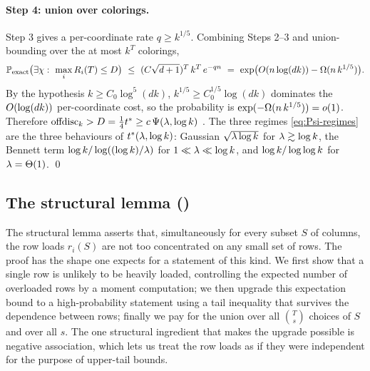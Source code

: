 \paragraph{Step 4: union over colorings.}
Step 3 gives a per-coordinate rate $q\ge k^{1/5}$. Combining Steps 2--3 and union-bounding over the at most $k^T$ colorings,
\[
  \Pr_{\mathrm{exact}}\big(\exists\chi:\ \max_i\rangeop_i(T)\le D\big)\ \le\ (C\sqrt{d+1})^T\,k^T\,e^{-q n}
  \ =\ \exp\!\big(\Oh(n\log(dk))-\Om(n\,k^{1/5})\big).
\]
By the hypothesis $k\ge C_0\log^5(dk)$, $k^{1/5}\ge C_0^{1/5}\log(dk)$ dominates the $O(\log(dk))$ per-coordinate cost, so
the probability is $\exp(-\Omega(n\,k^{1/5}))=o(1)$. Therefore $\mathrm{offdisc}_k>D=\tfrac14 t^*\ge c\,\Psi(\lambda,\log k)$ \whp. The three
regimes \eqref{eq:Psi-regimes} are the three behaviours of $t^*(\lambda,\log k)$: Gaussian $\sqrt{\lambda\log k}$ for
$\lambda\gtrsim\log k$, the Bennett term $\log k/\log((\log k)/\lambda)$ for $1\ll\lambda\ll\log k$, and $\log k/\log\log k$ for
$\lambda=\Theta(1)$. \qed

\subsection{The structural lemma ()}\label{app:structural-full}

The structural lemma asserts that, simultaneously for every subset $S$ of columns, the row loads $r_i(S)$ are not too
concentrated on any small set of rows. The proof has the shape one expects for a statement of this kind. We first show that
a single row is unlikely to be heavily loaded, controlling the expected number of overloaded rows by a moment computation;
we then upgrade this expectation bound to a high-probability statement using a tail inequality that survives the dependence
between rows; finally we pay for the union over all $\binom{T}{s}$ choices of $S$ and over all $s$. The one structural
ingredient that makes the upgrade possible is negative association, which lets us treat the row loads as if they were
independent for the purpose of upper-tail bounds.

